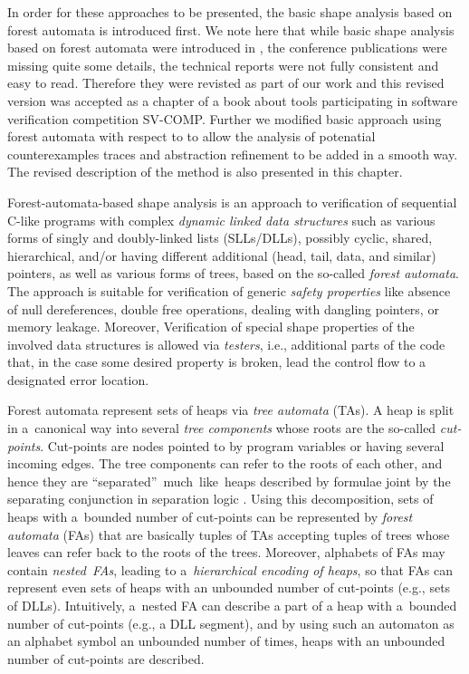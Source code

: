 In order for these approaches to be presented, the basic shape analysis based on forest automata
is introduced first. We note here that while basic shape analysis based on forest automata
were introduced in \cite{forester11,boxes13,forester12,forester11:techrep,techrep},
the conference publications \cite{forester11, boxes13} were missing quite some details,
the technical reports \cite{forester11:techrep, techrep} were not fully consistent
and easy to read.
Therefore they were revisted as part of our work and this revised version was accepted
as a chapter of a book about tools participating in software verification competition SV-COMP.
Further we modified basic approach using forest automata with respect to \cite{vmcai17}
to allow the analysis of potenatial counterexamples traces and abstraction refinement to be added in a smooth way.
The revised description of the method is also presented in this chapter.

Forest-automata-based shape analysis is an approach to verification of sequential C-like programs with complex \emph{dynamic linked
data structures} such as various forms of singly and doubly-linked lists
(SLLs/DLLs), possibly cyclic, shared, hierarchical, and/or having different
additional (head, tail, data, and similar) pointers, as well as various forms
of trees, based on the so-called \emph{forest automata}. 
The approach is suitable for verification of generic \emph{safety properties} like
absence of null dereferences, double free operations, dealing with dangling
pointers, or memory leakage. Moreover, Verification of special shape properties of
the involved data structures is allowed via \emph{testers}, i.e., additional parts of the
code that, in the
case some desired property is broken, lead the control flow to a designated
error location.

Forest automata represent sets of heaps via \emph{tree automata} (TAs). A heap is split in
a~canonical way into several \emph{tree components} whose roots are the so-called
\emph{cut-points}. Cut-points are nodes pointed to by program variables or
having several incoming edges. The tree components can refer to the roots of
each other, and hence they are ``separated''~much~like~heaps described by
formulae joint by the separating conjunction in separation logic
\cite{Reynolds:SepLogic:02}. Using this decomposition, sets of heaps with
a~bounded number of cut-points can be represented by \emph{forest automata} (FAs)
that are basically tuples of TAs accepting
tuples of trees whose leaves can refer back to the roots of the trees. Moreover,
alphabets of FAs may contain \emph{nested~FAs}, leading to
a~\emph{hierarchical encoding of heaps}, so that FAs can represent even sets of
heaps with an unbounded number of cut-points (e.g., sets of DLLs). Intuitively,
a~nested FA can describe a part of a heap with a~bounded number of cut-points
(e.g., a DLL segment), and by using such an automaton as an alphabet symbol an
unbounded number of times,  heaps with an unbounded number of cut-points are
described. 

